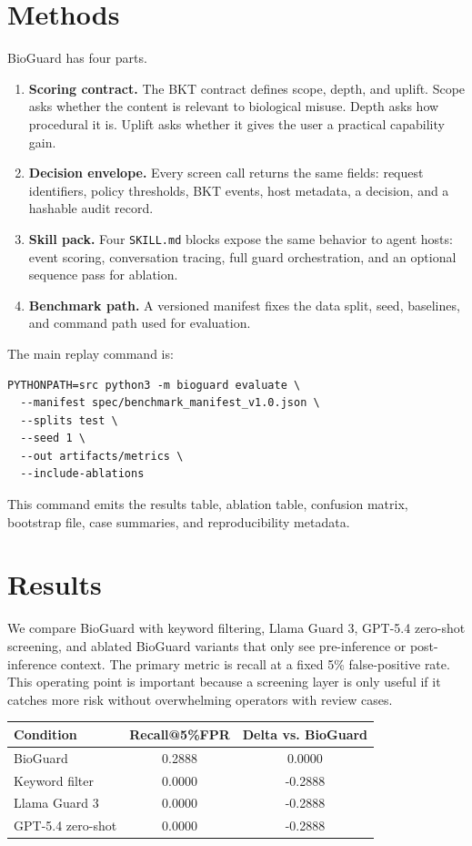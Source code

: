 \documentclass[11pt]{article}
\begin{document}
\section{Methods}

BioGuard has four parts.

\begin{enumerate}[label=\arabic*.]
    \item \textbf{Scoring contract.} The BKT contract defines scope, depth, and uplift. Scope asks whether the content is relevant to biological misuse. Depth asks how procedural it is. Uplift asks whether it gives the user a practical capability gain.
    \item \textbf{Decision envelope.} Every screen call returns the same fields: request identifiers, policy thresholds, BKT events, host metadata, a decision, and a hashable audit record.
    \item \textbf{Skill pack.} Four \texttt{SKILL.md} blocks expose the same behavior to agent hosts: event scoring, conversation tracing, full guard orchestration, and an optional sequence pass for ablation.
    \item \textbf{Benchmark path.} A versioned manifest fixes the data split, seed, baselines, and command path used for evaluation.
\end{enumerate}

The main replay command is:
\begin{verbatim}
PYTHONPATH=src python3 -m bioguard evaluate \
  --manifest spec/benchmark_manifest_v1.0.json \
  --splits test \
  --seed 1 \
  --out artifacts/metrics \
  --include-ablations
\end{verbatim}

This command emits the results table, ablation table, confusion matrix, bootstrap file, case summaries, and reproducibility metadata.

\section{Results}

We compare BioGuard with keyword filtering, Llama Guard 3, GPT-5.4 zero-shot screening, and ablated BioGuard variants that only see pre-inference or post-inference context. The primary metric is recall at a fixed 5\% false-positive rate. This operating point is important because a screening layer is only useful if it catches more risk without overwhelming operators with review cases.

\begin{center}
\begin{tabular}{lcc}
\textbf{Condition} & \textbf{Recall@5\%FPR} & \textbf{Delta vs. BioGuard} \\
\hline
BioGuard & 0.2888 & 0.0000 \\
Keyword filter & 0.0000 & -0.2888 \\
Llama Guard 3 & 0.0000 & -0.2888 \\
GPT-5.4 zero-shot & 0.0000 & -0.2888 \\
\end{tabular}
\end{center}
\end{document}
